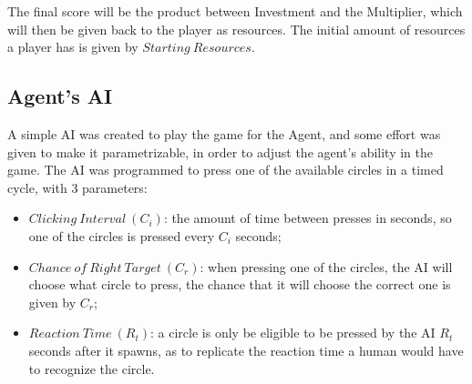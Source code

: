 The final score will be the product between Investment and the Multiplier, which will then be given back to the player as resources. The initial amount of resources a player has is given by $Starting\ Resources$.


\subsection{Agent's \ac{AI}}
A simple \ac{AI} was created to play the game for the Agent, and some effort was given to make it parametrizable, in order to adjust the agent's ability in the game. The \ac{AI} was programmed to press one of the available circles in a timed cycle, with 3 parameters:
\begin{itemize}
    \item $Clicking\ Interval\ (C_i)$: the amount of time between presses in seconds, so one of the circles is pressed every $C_i$ seconds;
    \item $Chance\ of\ Right\ Target\ (C_r)$: when pressing one of the circles, the \ac{AI} will choose what circle to press, the chance that it will choose the correct one is given by $C_r$;
    \item $Reaction\ Time\ (R_t)$: a circle is only be eligible to be pressed by the \ac{AI} $R_t$ seconds after it spawns, as to replicate the reaction time a human would have to recognize the circle.
\end{itemize}



